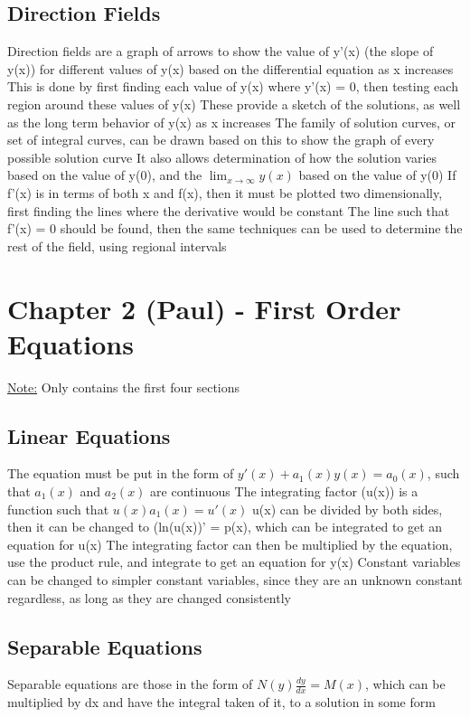 \documentclass[11 pt, twoside]{article}
\newenvironment{outline*}
{
	\begin{outline}[enumerate]
	}
	{\end{outline}
}
\begin{document}
\subsection{Direction Fields}
\begin{outline*}
\1 Direction fields are a graph of arrows to show the value of y’(x) (the slope of y(x)) for different values of y(x) based on the differential equation as x increases
\2 This is done by first finding each value of y(x) where y’(x) = 0, then testing each region around these values of y(x)
\1 These provide a sketch of the solutions, as well as the long term behavior of y(x) as x increases
\2 The family of solution curves, or set of integral curves, can be drawn based on this to show the graph of every possible solution curve
\2 It also allows determination of how the solution varies based on the value of y(0), and the $\lim_{x \to \infty}y(x)$ based on the value of y(0)
\1 If f’(x) is in terms of both x and f(x), then it must be plotted two dimensionally, first finding the lines where the derivative would be constant
\2 The line such that f’(x) = 0 should be found, then the same techniques can be used to determine the rest of the field, using regional intervals
\end{outline*}
\section{Chapter 2 (Paul) - First Order Equations}
\underline{Note:} Only contains the first four sections
\subsection{Linear Equations}
\begin{outline*}
\1 The equation must be put in the form of $y'(x) + a_1(x)y(x) = a_0(x)$, such that $a_1(x)$ and $a_2(x)$ are continuous
\1 The integrating factor (u(x)) is a function such that $u(x)a_1(x) = u'(x)$
\2 u(x) can be divided by both sides, then it can be changed to (ln(u(x))’ = p(x), which can be integrated to get an equation for u(x)
\1 The integrating factor can then be multiplied by the equation, use the product rule, and integrate to get an equation for y(x)
\1 Constant variables can be changed to simpler constant variables, since they are an unknown constant regardless, as long as they are changed consistently
\end{outline*}
\subsection{Separable Equations}
\begin{outline*}
\1 Separable equations are those in the form of $N(y)\frac{dy}{dx} = M(x)$, which can be multiplied by dx and have the integral taken of it, to a solution in some form
\end{outline*}
\end{document}
